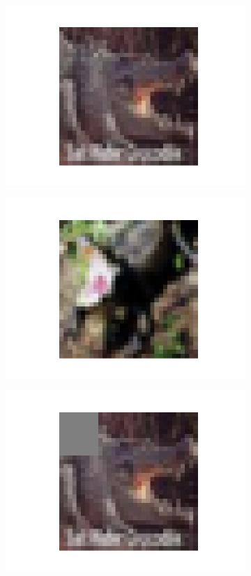 \documentclass{article}
\begin{document}
\begin{figure}[h]
\begin{subfigure}{0.19\textwidth}
\includegraphics[width=\linewidth]{figure/baseline0.png}
\end{subfigure}
\begin{subfigure}{0.19\textwidth}
\includegraphics[width=\linewidth]{figure/baseline3.png}
\end{subfigure}
\begin{subfigure}{0.19\textwidth}
\includegraphics[width=\linewidth]{figure/cutout0.png}

\end{subfigure}
\end{figure}
\end{document}
